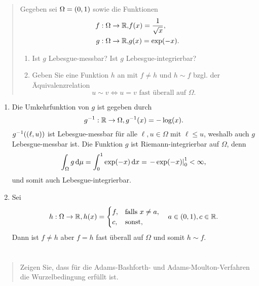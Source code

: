 \documentclass{exercise}
\begin{document}
    \begin{quote}
        Gegeben sei \(\Omega = \parentheses*{0, 1}\) sowie die Funktionen
        \begin{align*}
            f: \Omega \to \R, &f\parentheses*{x} = \frac{1}{\sqrt{x}},\\
            g: \Omega \to \R, &g\parentheses*{x} = \exp\parentheses*{-x}.
        \end{align*}
        \begin{enumerate}
            \item Ist \(g\) Lebesgue-messbar?
            Ist \(g\) Lebesgue-integrierbar?
            \item Geben Sie eine Funktion \(h\) an mit \(f \ne h\) und \(h \sim f\) bzgl. der Äquivalenzrelation
            \[
                u \sim v \iff u = v\text{ fast überall auf }\Omega.
            \]
        \end{enumerate}
    \end{quote}

    \begin{enumerate}
        \item Die Umkehrfunktion von \(g\) ist gegeben durch
        \[
            g^{-1}: \R \to \Omega, g^{-1}\parentheses*{x} = -\log\parentheses*{x}.
        \]
        \(g^{-1}\parentheses*{\parentheses*{\ell, u}}\) ist Lebesgue-messbar für alle \(\ell, u \in \Omega\) mit \(\ell \le u\), weshalb auch \(g\) Lebesgue-messbar ist.
        Die Funktion \(g\) ist Riemann-integrierbar auf \(\Omega\), denn
        \[
            \int_\Omega g\d\mu = \int_0^1 \exp\parentheses*{-x}\d x = \left.-\exp\parentheses*{-x}\right|_0^1 < \infty,
        \]
        und somit auch Lebesgue-integrierbar.
        \item Sei
        \[
            h: \Omega \to \R, h\parentheses*{x} = \begin{cases}
                f, & \text{falls }x \ne a,\\
                c, & \text{sonst},
            \end{cases} \quad a \in \parentheses*{0, 1}, c \in \R.
        \]
        Dann ist \(f \ne h\) aber \(f = h\) fast überall auf \(\Omega\) und somit \(h \sim f\).
    \end{enumerate}
    
    
    \section{}
    
    \begin{quote}
        Zeigen Sie, dass für die Adams-Bashforth- und Adams-Moulton-Verfahren die Wurzelbedingung erfüllt ist.
    \end{quote}
\end{document}
